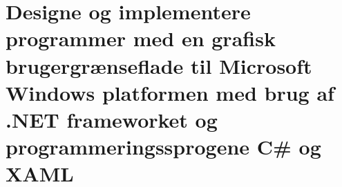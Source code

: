 \section{Designe og implementere programmer med en grafisk brugergrænseflade til Microsoft Windows platformen med brug af .NET frameworket og programmeringssprogene C\# og XAML}\label{sec:spm2}